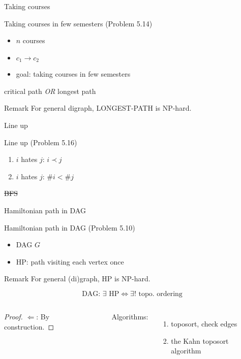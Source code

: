 \begin{frame}{Taking courses}
  \begin{exampleblock}{Taking courses in few semesters (Problem 5.14)}
	\begin{itemize}
	  \item $n$ courses
	  \item $c_1 \to c_2$
	  \item goal: taking courses in few semesters
	\end{itemize}
  \end{exampleblock}

  \pause
  \begin{center}
	critical path \emph{OR} longest path
  \end{center}

  \pause
  \begin{alertblock}{Remark}
	For general digraph, LONGEST-PATH is NP-hard.
  \end{alertblock}
\end{frame}
\begin{frame}{Line up}
  \begin{exampleblock}{Line up (Problem 5.16)}
    \begin{enumerate}
      \item $i$ hates $j$: $i \prec j$
      \item $i$ hates $j$: $\# i < \# j$
    \end{enumerate}
  \end{exampleblock}

  \vspace{0.50cm}
  \centerline{\sout{BFS}}
\end{frame}
\begin{frame}{Hamiltonian path in DAG}
  \begin{exampleblock}{Hamiltonian path in DAG (Problem 5.10)}
    \begin{itemize}
      \item DAG $G$
      \item HP: path visiting each vertex once
    \end{itemize}
  \end{exampleblock}

  \pause
  \begin{alertblock}{Remark}
    For general (di)graph, HP is NP-hard.
  \end{alertblock}

  \pause
  \[
	\text{DAG: } \exists \text{ HP} \iff \exists! \text{ topo. ordering}
  \]

  \begin{columns}
	  \pause
	  \begin{proof}
		$\Longleftarrow$: By construction.
	  \end{proof}
	  \pause
	  Algorithms:
	  \begin{enumerate}
		\item toposort, check edges
		  \pause
		\item the Kahn toposort algorithm
	  \end{enumerate}
	\end{columns}
\end{frame}
